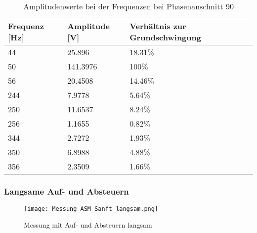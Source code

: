 \begin{table}[ht!]
	\centering
	\begin{tabular}{|l|l|l|}
		\hline
		Frequenz {[}Hz{]} & Amplitude {[}V{]} & Verhältnis zur Grundschwingung \\ \hline
		44                & 25.896            & 18.31\%                        \\ \hline
		50                & 141.3976          & 100\%                          \\ \hline
		56                & 20.4508           & 14.46\%                        \\ \hline
		244               & 7.9778            & 5.64\%                         \\ \hline
		250               & 11.6537           & 8.24\%                         \\ \hline
		256               & 1.1655            & 0.82\%                         \\ \hline
		344               & 2.7272            & 1.93\%                         \\ \hline
		350               & 6.8988            & 4.88\%                         \\ \hline
		356               & 2.3509            & 1.66\%                         \\ \hline
	\end{tabular}
\caption{Amplitudenwerte bei der Frequenzen bei Phasenanschnitt 90\textdegree}\label{tab:Mess_Spannung_ASM_Phas90}
\end{table}

\newpage
\subsubsection*{Langsame Auf- und Absteuern}
\begin{figure}[ht!]
	\centering
	\texttt{[image: Messung\_ASM\_Sanft\_langsam.png]}	
	\caption{Messung mit Auf- und Absteuern langsam}\label{fig:Mess_ASM_Sanft_langsam}
\end{figure}

